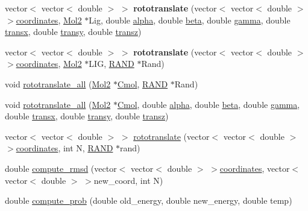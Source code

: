 \begin{DoxyCompactItemize}
\item 
\hypertarget{classCOORD__MC_accbf9887772987d587c6468743972e47}{
vector$<$ vector$<$ double $>$ $>$ {\bfseries rototranslate} (vector$<$ vector$<$ double $>$ $>$\hyperlink{classCOORD__MC_ad57a46a39d0a10f664128225e24bf99f}{coordinates}, \hyperlink{classMol2}{Mol2} $\ast$Lig, double \hyperlink{classCOORD__MC_a80872e7f1fedc71b060472be6565e83a}{alpha}, double \hyperlink{classCOORD__MC_a60fa21206cc164282a8d7b4e45b322c2}{beta}, double \hyperlink{classCOORD__MC_a67fa08c5c5dddf4cf3b5d01789124892}{gamma}, double \hyperlink{classCOORD__MC_acc43aa187cde8621749a6297895906b5}{transx}, double \hyperlink{classCOORD__MC_abcea4fc50769038aa68487317f07d208}{transy}, double \hyperlink{classCOORD__MC_ae6a278f635288d901a8d00a512ab481b}{transz})}
\label{classCOORD__MC_accbf9887772987d587c6468743972e47}

\item 
\hypertarget{classCOORD__MC_a8575dab03d846a6e6291684574dcf473}{
vector$<$ vector$<$ double $>$ $>$ {\bfseries rototranslate} (vector$<$ vector$<$ double $>$ $>$\hyperlink{classCOORD__MC_ad57a46a39d0a10f664128225e24bf99f}{coordinates}, \hyperlink{classMol2}{Mol2} $\ast$LIG, \hyperlink{classRAND}{RAND} $\ast$Rand)}
\label{classCOORD__MC_a8575dab03d846a6e6291684574dcf473}

\item 
void \hyperlink{classCOORD__MC_a589bdc525228164c9d212312f262e3c8}{rototranslate\_\-all} (\hyperlink{classMol2}{Mol2} $\ast$\hyperlink{classCOORD__MC_abdacaab2b3fca9018229d3ec220cf39d}{Cmol}, \hyperlink{classRAND}{RAND} $\ast$Rand)
\item 
void \hyperlink{classCOORD__MC_ab54ac0814f32c1b752807a062546bcd3}{rototranslate\_\-all} (\hyperlink{classMol2}{Mol2} $\ast$\hyperlink{classCOORD__MC_abdacaab2b3fca9018229d3ec220cf39d}{Cmol}, double \hyperlink{classCOORD__MC_a80872e7f1fedc71b060472be6565e83a}{alpha}, double \hyperlink{classCOORD__MC_a60fa21206cc164282a8d7b4e45b322c2}{beta}, double \hyperlink{classCOORD__MC_a67fa08c5c5dddf4cf3b5d01789124892}{gamma}, double \hyperlink{classCOORD__MC_acc43aa187cde8621749a6297895906b5}{transx}, double \hyperlink{classCOORD__MC_abcea4fc50769038aa68487317f07d208}{transy}, double \hyperlink{classCOORD__MC_ae6a278f635288d901a8d00a512ab481b}{transz})
\item 
vector$<$ vector$<$ double $>$ $>$ \hyperlink{classCOORD__MC_a08009030898b97b0ab3ca85fc79f663e}{rototranslate} (vector$<$ vector$<$ double $>$ $>$\hyperlink{classCOORD__MC_ad57a46a39d0a10f664128225e24bf99f}{coordinates}, int N, \hyperlink{classRAND}{RAND} $\ast$rand)
\item 
double \hyperlink{classCOORD__MC_a3e94bd18aedf819364703921c9ce7a35}{compute\_\-rmsd} (vector$<$ vector$<$ double $>$ $>$\hyperlink{classCOORD__MC_ad57a46a39d0a10f664128225e24bf99f}{coordinates}, vector$<$ vector$<$ double $>$ $>$new\_\-coord, int N)
\item 
double \hyperlink{classCOORD__MC_a35f89a9d58d63bddebc1f3e5e48c4091}{compute\_\-prob} (double old\_\-energy, double new\_\-energy, double temp)
\end{DoxyCompactItemize}

